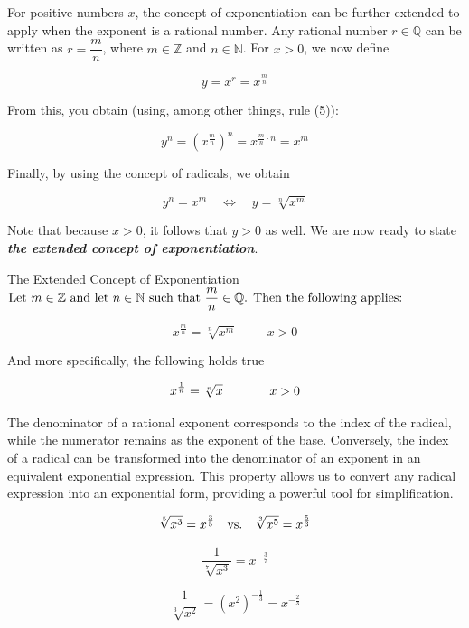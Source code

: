 For positive numbers \(x\), the concept of exponentiation can be further extended to apply when the exponent is a rational number. Any rational number \(r \in \mathbb{Q}\) can be written as \(r = \dfrac{m}{n}\), where \(m \in \mathbb{Z}\) and \(n \in \mathbb{N}\). For \(x > 0\), we now define

\begin{equation*}
y=x^r=x^{\frac{m}{n}}
\end{equation*}

From this, you obtain (using, among other things, rule (5)):

\[
y^n = \left(x^{\frac{m}{n}}\right)^n = x^{\frac{m}{n} \cdot n} = x^m
\]

Finally, by using the concept of radicals, we obtain

\begin{equation*}
 y^n=x^m \quad \iff \quad y=\sqrt[n]{x^m}   
\end{equation*}

Note that because \(x > 0\), it follows that \(y > 0\) as well. We are now ready to state \textbf{\textit{the extended concept of exponentiation}}.

\begin{definition}{The Extended Concept of Exponentiation}
$\textnormal{Let } m \in \mathbb{Z} \textnormal{ and let }  n \in \mathbb{N} \textnormal{ such that } \dfrac{m}{n} \in \mathbb{Q}  \textnormal{. Then the following applies:}$

\[
x^{\frac{m}{n}} = \sqrt[n]{x^m} \hspace{1cm} x > 0
\]

\textnormal{And more specifically, the following holds true}

\[
x^{\frac{1}{n}} = \sqrt[n]{x} \hspace{1.3cm} x > 0
\]

\end{definition}

The denominator of a rational exponent corresponds to the index of the radical, while the numerator remains as the exponent of the base. Conversely, the index of a radical can be transformed into the denominator of an exponent in an equivalent exponential expression. This property allows us to convert any radical expression into an exponential form, providing a powerful tool for simplification.

\begin{example}

\[
\sqrt[5]{x^3} = x^{\frac{3}{5}} \quad  \textnormal{vs.} \quad \sqrt[3]{x^5} = x^{\frac{5}{3}}
\]

\[
\frac{1}{\sqrt[7]{x^3}} = x^{-\frac{3}{7}}
\]

\[
\frac{1}{\sqrt[3]{x^2}} = \left(x^2\right)^{-\frac{1}{3}} = x^{-\frac{2}{3}}
\]
\end{example}

